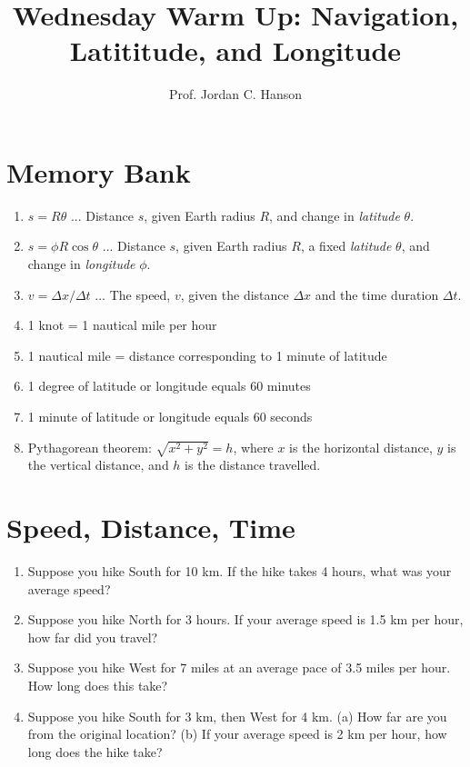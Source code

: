 \documentclass{article}
\begin{document}
\twocolumn

\title{Wednesday Warm Up: Navigation, Latititude, and Longitude}
\author{Prof. Jordan C. Hanson}

\maketitle

\section{Memory Bank}

\begin{enumerate}
\item $s = R\theta$ ... Distance $s$, given Earth radius $R$, and change in \textit{latitude} $\theta$.
\item $s = \phi R\cos\theta$ ... Distance $s$, given Earth radius $R$, a fixed \textit{latitude} $\theta$, and change in \textit{longitude} $\phi$.
\item $v = \Delta x/\Delta t$ ... The speed, $v$, given the distance $\Delta x$ and the time duration $\Delta t$.
\item 1 knot = 1 nautical mile per hour
\item 1 nautical mile = distance corresponding to 1 minute of latitude
\item 1 degree of latitude or longitude equals 60 minutes
\item 1 minute of latitude or longitude equals 60 seconds
\item Pythagorean theorem: $\sqrt{x^2 + y^2} = h$, where $x$ is the horizontal distance, $y$ is the vertical distance, and $h$ is the distance travelled.
\end{enumerate}

\section{Speed, Distance, Time}

\begin{enumerate}
\item Suppose you hike South for 10 km.  If the hike takes 4 hours, what was your average speed? \\ \vspace{2cm}
\item Suppose you hike North for 3 hours.  If your average speed is 1.5 km per hour, how far did you travel? \\ \vspace{2cm}
\item Suppose you hike West for 7 miles at an average pace of 3.5 miles per hour.  How long does this take? \\ \vspace{2cm}
\item Suppose you hike South for 3 km, then West for 4 km.  (a) How far are you from the original location? (b) If your average speed is 2 km per hour, how long does the hike take? \\ \vspace{2cm}
\end{enumerate}
\end{document}
